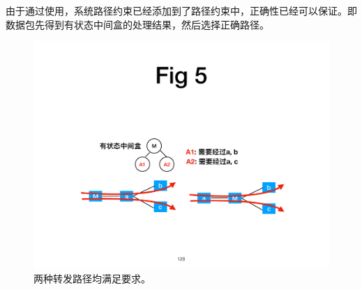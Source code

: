 
由于通过使用，系统路径约束已经添加到了路径约束中，正确性已经可以保证。即数据包先得到有状态中间盒的处理结果，然后选择正确路径。


\begin{figure}[!htbp]
\centering
      \centering\includegraphics[width=\linewidth]{figures/ss-128.pdf}
\caption{两种转发路径均满足要求。}
\label{fig:c-example}
\end{figure}


